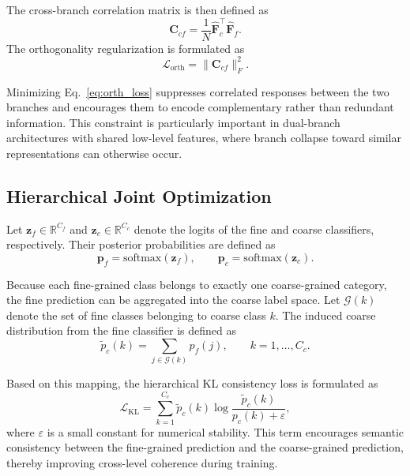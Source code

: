 \documentclass[pdflatex,iicol,sn-mathphys-num]{sn-jnl}
\theoremstyle{thmstyleone}%
\theoremstyle{thmstyletwo}%
\theoremstyle{thmstylethree}%
\begin{document}
The cross-branch correlation matrix is then defined as
\begin{equation}
\mathbf{C}_{cf} = \frac{1}{N}\hat{\mathbf{F}}_c^\top \hat{\mathbf{F}}_f.
\end{equation}
The orthogonality regularization is formulated as
\begin{equation}
\mathcal{L}_{\text{orth}} = \|\mathbf{C}_{cf}\|_F^2.
\label{eq:orth_loss}
\end{equation}

Minimizing Eq.~\eqref{eq:orth_loss} suppresses correlated responses between the two branches and encourages them to encode complementary rather than redundant information. 
This constraint is particularly important in dual-branch architectures with shared low-level features, where branch collapse toward similar representations can otherwise occur.

\subsection{Hierarchical Joint Optimization}

Let $\mathbf{z}_f \in \mathbb{R}^{C_f}$ and $\mathbf{z}_c \in \mathbb{R}^{C_c}$ denote the logits of the fine and coarse classifiers, respectively. 
Their posterior probabilities are defined as
\begin{equation}
\mathbf{p}_f = \mathrm{softmax}(\mathbf{z}_f), \qquad
\mathbf{p}_c = \mathrm{softmax}(\mathbf{z}_c).
\end{equation}

Because each fine-grained class belongs to exactly one coarse-grained category, the fine prediction can be aggregated into the coarse label space. 
Let $\mathcal{G}(k)$ denote the set of fine classes belonging to coarse class $k$. 
The induced coarse distribution from the fine classifier is defined as
\begin{equation}
\tilde{p}_c(k) = \sum_{j \in \mathcal{G}(k)} p_f(j), \qquad k=1,\dots,C_c.
\label{eq:fine_to_coarse}
\end{equation}

Based on this mapping, the hierarchical KL consistency loss is formulated as
\begin{equation}
\mathcal{L}_{\mathrm{KL}} = \sum_{k=1}^{C_c} \tilde{p}_c(k)\log\frac{\tilde{p}_c(k)}{p_c(k)+\varepsilon},
\label{eq:kl_loss}
\end{equation}
where $\varepsilon$ is a small constant for numerical stability. 
This term encourages semantic consistency between the fine-grained prediction and the coarse-grained prediction, thereby improving cross-level coherence during training.
\end{document}
